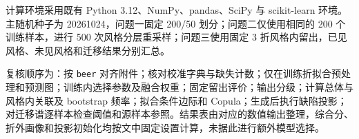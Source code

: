 \documentclass[
  chinese,
  11pt,
]{article}
\begin{document}
计算环境采用既有 Python 3.12、NumPy、pandas、SciPy 与 scikit-learn
环境。主随机种子为 20261024，问题一固定 200/50 划分；问题二仅使用相同的
200 个训练样本，进行 500 次风格分层重采样；问题三使用固定 3
折风格内留出，已见风格、未见风格和迁移结果分别汇总。

复核顺序为：按 \texttt{beer}
对齐附件；核对校准字典与缺失计数；仅在训练折拟合预处理和预测图；训练内选择参数及融合权重；固定留出评价；输出分级；计算总体与风格内关联及
bootstrap 频率；拟合条件边际和
Copula；生成后执行缺陷投影；对迁移谱逐样本检查阈值和源样本参照。结果表由对应的数值输出整理，综合分、折外画像和投影初始化均按文中固定设置计算，未据此进行额外模型选择。
\end{document}

